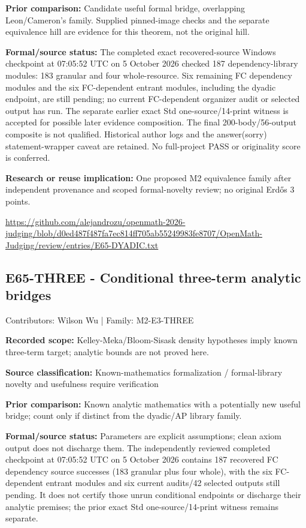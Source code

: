 \documentclass[11pt,a4paper]{article}
\begin{document}
\textbf{Prior comparison:} Candidate useful formal bridge, overlapping Leon/Cameron's family. Supplied pinned-image checks and the separate equivalence hill are evidence for this theorem, not the original hill.

\textbf{Formal/source status:} The completed exact recovered-source Windows checkpoint at 07:05:52 UTC on 5 October 2026 checked 187 dependency-library modules: 183 granular and four whole-resource. Six remaining FC dependency modules and the six FC-dependent entrant modules, including the dyadic endpoint, are still pending; no current FC-dependent organizer audit or selected output has run. The separate earlier exact Std one-source/14-print witness is accepted for possible later evidence composition. The final 200-body/56-output composite is not qualified. Historical author logs and the answer(sorry) statement-wrapper caveat are retained. No full-project PASS or originality score is conferred.

\textbf{Research or reuse implication:} One proposed M2 equivalence family after independent provenance and scoped formal-novelty review; no original Erdős 3 points.

{\small \url{https://github.com/alejandrozu/openmath-2026-judging/blob/d0ed487f487fa7ec814ff705ab55249983fe8707/OpenMath-Judging/review/entries/E65-DYADIC.txt}\par}

\begin{samepage}
\subsection{E65-THREE  -  Conditional three-term analytic bridges}
{\small Contributors: Wilson Wu | Family: M2-E3-THREE\par}

\textbf{Recorded scope:} Kelley-Meka/Bloom-Sisask density hypotheses imply known three-term target; analytic bounds are not proved here.

\end{samepage}
\textbf{Source classification:} Known-mathematics formalization / formal-library novelty and usefulness require verification

\textbf{Prior comparison:} Known analytic mathematics with a potentially new useful bridge; count only if distinct from the dyadic/AP library family.

\textbf{Formal/source status:} Parameters are explicit assumptions; clean axiom output does not discharge them. The independently reviewed completed checkpoint at 07:05:52 UTC on 5 October 2026 contains 187 recovered FC dependency source successes (183 granular plus four whole), with the six FC-dependent entrant modules and six current audits/42 selected outputs still pending. It does not certify those unrun conditional endpoints or discharge their analytic premises; the prior exact Std one-source/14-print witness remains separate.
\end{document}
